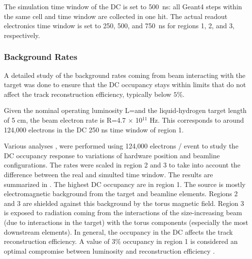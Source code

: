 The simulation time window of the DC is set to 500~ns: all Geant4 steps within the same cell and time window are collected in one hit.
The actual readout electronics time window is set to 250, 500, and 750~ns for regions 1, 2, and 3, respectively.


\subsubsection{Background Rates}

A detailed study of the background rates coming from beam interacting with the target was done to ensure that the DC occupancy stays
within limits that do not affect the track reconstruction efficiency, typically below $5\%$.

Given the nominal operating luminosity L=\cLuminosity and the liquid-hydrogen target length of 5 cm, the beam electron rate
is R=4.7 $\times$ 10$^{11}$ Hz. This corresponds to around 124,000 electrons in the DC 250 ns time window of region 1.

Various analyses \cite{targetStudy, clas12Beamline, clas12Background}, were performed using 124,000 electrons / event
to study the DC occupancy response to variations of hardware position and beamline configurations. The rates were scaled in region 2 and 3 to take into account the
difference between the real and simulted time window.
The results are summarized in . The highest DC occupancy are in region 1. The source is mostly electromagnetic background from the target
and beamline elements. Regions 2 and 3 are shielded against this background by the torus magnetic field. Region 3 is exposed to radiation coming from
the interactions of the size-increasing beam (due to interactions in the target) with the torus components (especially the most downstream elements).
In general, the occupancy in the DC affects the track reconstruction efficiency. A value of 3$\%$ occupancy in region 1
is considered an optimal compromise between luminosity and reconstruction efficiency \cite{recon-nim}.

